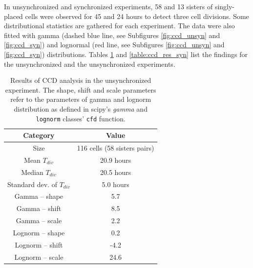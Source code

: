 \documentclass[pdftex,12pt,a4paper]{report}
\begin{document}
In unsynchronized and synchronized experiments, 58 and 13 sisters of singly-placed cells were observed for 45 and 24 hours to detect three cell divisions. Some distributional statistics are gathered for each experiment. The data were also fitted with gamma (dashed blue line, see Subfigures \ref{fig:ccd_unsyn} and \ref{fig:ccd_syn}) and lognormal (red line, see Subfigures \ref{fig:ccd_unsyn} and \ref{fig:ccd_syn}) distributions.  Tables \ref{table:ccd_res_unsyn} and \ref{table:ccd_res_syn} list the findings for the unsynchronized and the unsynchronized experiments.

\begin{table}[H]
\centering
\begin{tabular}{ c | c }
Category & Value \\
\hline\hline
Size & 116 cells (58 sisters pairs) \\
Mean $T_{div}$ & 20.9 hours \\
Median $T_{div}$ & 20.5 hours \\
Standard dev. of $T_{div}$ & 5.0 hours \\
\hline
Gamma -- shape & 5.7 \\
Gamma -- shift & 8.5 \\
Gamma -- scale & 2.2 \\
\hline Lognorm -- shape & 0.2 \\
Lognorm --  shift & -4.2 \\
Lognorm --  scale & 24.6 \\
\hline
\end{tabular}
\caption[Results of CCD analysis in the unsynchronized experiment]{Results of CCD analysis in the unsynchronized experiment. The shape, shift and scale parameters refer to the parameters of gamma and lognorm  distribution as defined in scipy's \textit{gamma} and \texttt{lognorm} classes' \texttt{cfd} function.}
\label{table:ccd_res_unsyn}
\end{table}
\end{document}
